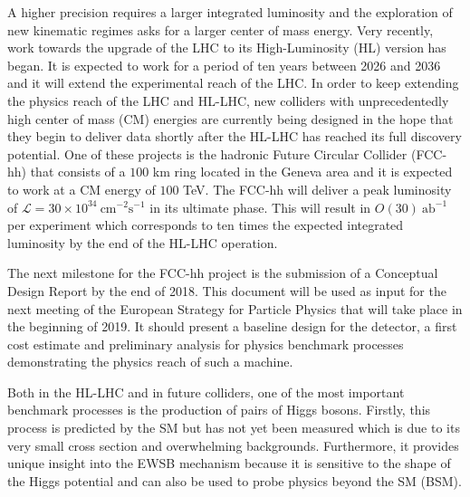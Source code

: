 A higher precision requires a larger integrated luminosity and the exploration of new kinematic regimes asks for a larger center of mass energy. Very recently, work towards the upgrade of the LHC to its High-Luminosity (HL) version has began. It is expected to work for a period of ten years between 2026 and 2036 and it will extend the experimental reach of the LHC. In order to keep extending the physics reach of the LHC and HL-LHC, new colliders with unprecedentedly high center of mass (CM) energies are currently being designed in the hope that they begin to deliver data shortly after the HL-LHC has reached its full discovery potential. One of these projects is the hadronic Future Circular Collider (FCC-hh) that consists of a $100$ km ring located in the Geneva area and it is expected to work at a CM energy of $100$ TeV. The FCC-hh will deliver a peak luminosity of $\mathcal{L}=30\times 10^{34}~\text{cm}^{-2}\text{s}^{-1}$ in its ultimate phase. This will result in $O(30)~\text{ab}^{-1}$ per experiment which corresponds to ten times the expected integrated luminosity by the end of the HL-LHC operation. 

The next milestone for the FCC-hh project is the submission of a Conceptual Design Report by the end of 2018. This document will be used as input for the next meeting of the European Strategy for Particle Physics that will take place in the beginning of 2019. It should present a baseline design for the detector, a first cost estimate and preliminary analysis for physics benchmark processes demonstrating the physics reach of such a machine.

Both in the HL-LHC and in future colliders, one of the most important benchmark processes is the production of pairs of Higgs bosons. Firstly, this process is predicted by the SM but has not yet been measured which is due to its very small cross section and overwhelming backgrounds. Furthermore, it provides unique insight into the EWSB mechanism because it is sensitive to the shape of the Higgs potential and can also be used to probe physics beyond the SM (BSM).


